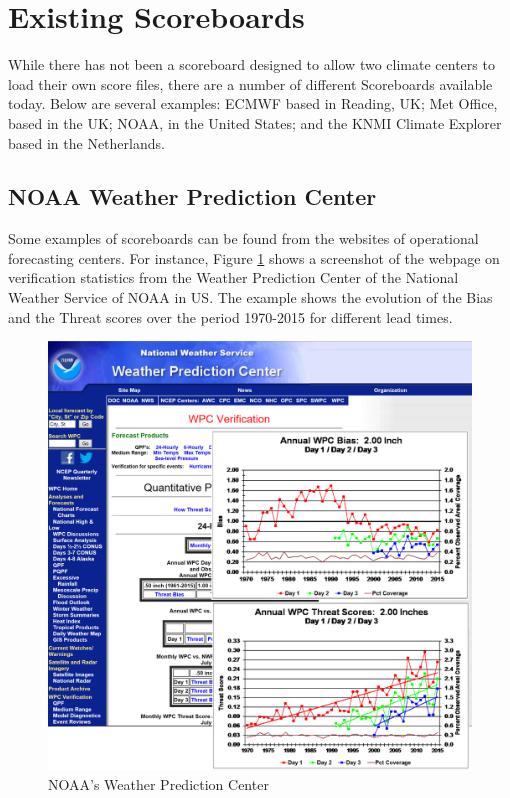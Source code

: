 \documentclass[logos,parttoc,morelanguage=french,morelanguage=german,draft]{orsay-memoire}
\begin{document}
\section{Existing Scoreboards} \label{sec:ExistingScoreboards}

While there has not been a scoreboard designed to allow two climate centers to load their own score files, there are a number of different Scoreboards available today. Below are several examples: ECMWF based in Reading, UK; Met Office, based in the UK; NOAA, in the United States; and the KNMI Climate Explorer based in the Netherlands.


%
%

\subsection*{NOAA Weather Prediction Center}
Some examples of scoreboards can be found from the websites of operational forecasting centers. For instance, Figure \ref{fig:noaaWPC} shows a screenshot of the webpage on verification statistics from the Weather Prediction Center of the National Weather Service of NOAA in US. The example shows the evolution of the Bias and the Threat scores over the period 1970-2015 for different lead times.

\begin{figure}[h]
\centering
\includegraphics[width=0.85\linewidth]{images/exempleNOAAwpc.png}
  \caption{NOAA's Weather Prediction Center}
  \label{fig:noaaWPC}
\end{figure}
\end{document}
